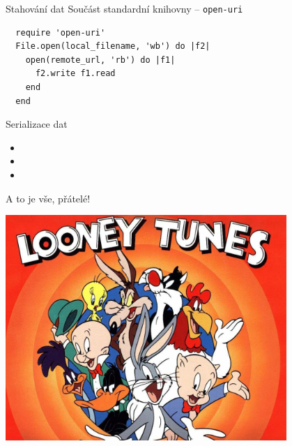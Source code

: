 \documentclass{beamer}
\begin{document}
\begin{frame}[fragile]{Stahování dat}
  Součást standardní knihovny -- \texttt{open-uri}
  \scriptsize
\begin{verbatim}
  require 'open-uri'
  File.open(local_filename, 'wb') do |f2|
    open(remote_url, 'rb') do |f1|
      f2.write f1.read
    end
  end
\end{verbatim}
\end{frame}


\begin{frame}{Serializace dat}
  \begin{itemize}
    \item
    \item
    \item
  \end{itemize}
\end{frame}






\begin{frame}{A to je vše, přátelé!}
  \begin{center}
    \includegraphics[width=0.8\textwidth]{looney_tunes}
  \end{center}
\end{frame}
\end{document}
